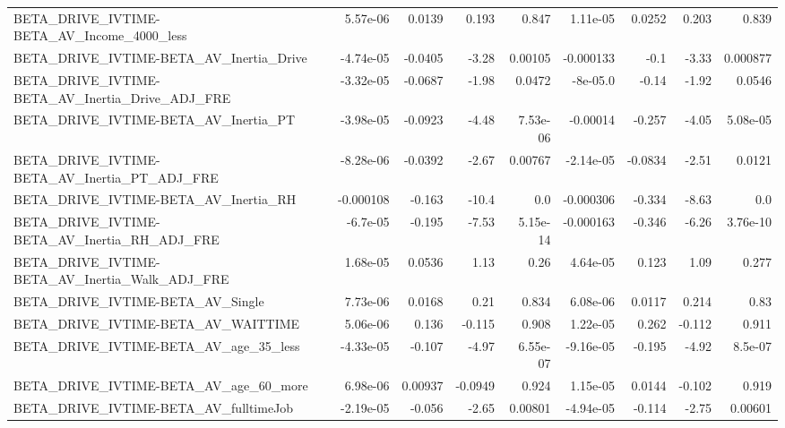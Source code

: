 \begin{tabular}{lrrrrrrrr}
BETA\_DRIVE\_IVTIME-BETA\_AV\_Income\_4000\_less         &    5.57e-06 &       0.0139 &    0.193 &    0.847 &   1.11e-05 &      0.0252 &        0.203 &         0.839 \\
BETA\_DRIVE\_IVTIME-BETA\_AV\_Inertia\_Drive            &   -4.74e-05 &      -0.0405 &    -3.28 &  0.00105 &  -0.000133 &        -0.1 &        -3.33 &      0.000877 \\
BETA\_DRIVE\_IVTIME-BETA\_AV\_Inertia\_Drive\_ADJ\_FRE    &   -3.32e-05 &      -0.0687 &    -1.98 &   0.0472 &   -8e-05.0 &       -0.14 &        -1.92 &        0.0546 \\
BETA\_DRIVE\_IVTIME-BETA\_AV\_Inertia\_PT               &   -3.98e-05 &      -0.0923 &    -4.48 & 7.53e-06 &   -0.00014 &      -0.257 &        -4.05 &      5.08e-05 \\
BETA\_DRIVE\_IVTIME-BETA\_AV\_Inertia\_PT\_ADJ\_FRE       &   -8.28e-06 &      -0.0392 &    -2.67 &  0.00767 &  -2.14e-05 &     -0.0834 &        -2.51 &        0.0121 \\
BETA\_DRIVE\_IVTIME-BETA\_AV\_Inertia\_RH               &   -0.000108 &       -0.163 &    -10.4 &      0.0 &  -0.000306 &      -0.334 &        -8.63 &           0.0 \\
BETA\_DRIVE\_IVTIME-BETA\_AV\_Inertia\_RH\_ADJ\_FRE       &    -6.7e-05 &       -0.195 &    -7.53 & 5.15e-14 &  -0.000163 &      -0.346 &        -6.26 &      3.76e-10 \\
BETA\_DRIVE\_IVTIME-BETA\_AV\_Inertia\_Walk\_ADJ\_FRE     &    1.68e-05 &       0.0536 &     1.13 &     0.26 &   4.64e-05 &       0.123 &         1.09 &         0.277 \\
BETA\_DRIVE\_IVTIME-BETA\_AV\_Single                   &    7.73e-06 &       0.0168 &     0.21 &    0.834 &   6.08e-06 &      0.0117 &        0.214 &          0.83 \\
BETA\_DRIVE\_IVTIME-BETA\_AV\_WAITTIME                 &    5.06e-06 &        0.136 &   -0.115 &    0.908 &   1.22e-05 &       0.262 &       -0.112 &         0.911 \\
BETA\_DRIVE\_IVTIME-BETA\_AV\_age\_35\_less              &   -4.33e-05 &       -0.107 &    -4.97 & 6.55e-07 &  -9.16e-05 &      -0.195 &        -4.92 &       8.5e-07 \\
BETA\_DRIVE\_IVTIME-BETA\_AV\_age\_60\_more              &    6.98e-06 &      0.00937 &  -0.0949 &    0.924 &   1.15e-05 &      0.0144 &       -0.102 &         0.919 \\
BETA\_DRIVE\_IVTIME-BETA\_AV\_fulltimeJob              &   -2.19e-05 &       -0.056 &    -2.65 &  0.00801 &  -4.94e-05 &      -0.114 &        -2.75 &       0.00601 \\

\end{tabular}
